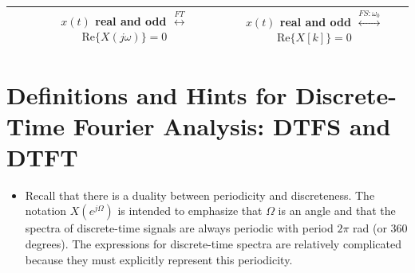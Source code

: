 \documentclass{article}
\newcommand{\dw}{\Omega} %
\newcommand{\aw}{\omega} %
\begin{document}
\begin{table}[H]
\begin{center}
{\begin{tabular}{|c|c|c|c|}
&
&
$x(t)$ real and odd
$\overset{FT}{\longleftrightarrow}$
$\mathrm{Re}\{X(j\aw)\}=0$
&
$x(t)$ real and odd
$\overset{FS:\aw_0}{\longleftrightarrow}$
$\mathrm{Re}\{X[k]\}=0$
\\

\hline

\end{tabular}
}
\end{center}
\end{table}



\section{Definitions and Hints for Discrete-Time Fourier Analysis: DTFS and DTFT}

\begin{itemize}

\item Recall that there is a duality between periodicity and discreteness. The notation $X(e^{j\dw})$ is intended to emphasize that $\dw$ is an angle and that the spectra of discrete-time signals are always periodic with period $2\pi$ rad (or 360 degrees). The expressions for discrete-time spectra are relatively complicated because they must explicitly represent this periodicity.

\end{itemize}
\end{document}
